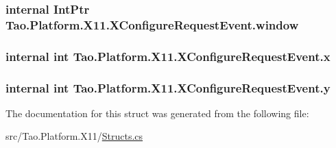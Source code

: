 \label{struct_tao_1_1_platform_1_1_x11_1_1_x_configure_request_event_aeac9e69e4425eb3e0c115ab5c1ad321d}
\hypertarget{struct_tao_1_1_platform_1_1_x11_1_1_x_configure_request_event_a30719e0cb2a03ece21210ff5d263519c}{
\subsubsection[{window}]{\setlength{\rightskip}{0pt plus 5cm}internal IntPtr {\bf Tao.Platform.X11.XConfigureRequestEvent.window}}}
\label{struct_tao_1_1_platform_1_1_x11_1_1_x_configure_request_event_a30719e0cb2a03ece21210ff5d263519c}
\hypertarget{struct_tao_1_1_platform_1_1_x11_1_1_x_configure_request_event_af52dfb96eacd083f3e6ba5d84ad12aab}{
\subsubsection[{x}]{\setlength{\rightskip}{0pt plus 5cm}internal int {\bf Tao.Platform.X11.XConfigureRequestEvent.x}}}
\label{struct_tao_1_1_platform_1_1_x11_1_1_x_configure_request_event_af52dfb96eacd083f3e6ba5d84ad12aab}
\hypertarget{struct_tao_1_1_platform_1_1_x11_1_1_x_configure_request_event_af6989ddbbcb106b0c6d892a30584d68a}{
\subsubsection[{y}]{\setlength{\rightskip}{0pt plus 5cm}internal int {\bf Tao.Platform.X11.XConfigureRequestEvent.y}}}
\label{struct_tao_1_1_platform_1_1_x11_1_1_x_configure_request_event_af6989ddbbcb106b0c6d892a30584d68a}


The documentation for this struct was generated from the following file:\begin{DoxyCompactItemize}
\item 
src/Tao.Platform.X11/\hyperlink{_structs_8cs}{Structs.cs}\end{DoxyCompactItemize}
